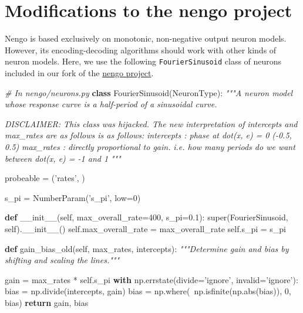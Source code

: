 \documentclass{report}
\newenvironment{Shaded}{}{}
\newcommand{\KeywordTok}[1]{\textcolor[rgb]{0.00,0.44,0.13}{\textbf{{#1}}}}
\newcommand{\DecValTok}[1]{\textcolor[rgb]{0.25,0.63,0.44}{{#1}}}
\newcommand{\FloatTok}[1]{\textcolor[rgb]{0.25,0.63,0.44}{{#1}}}
\newcommand{\StringTok}[1]{\textcolor[rgb]{0.25,0.44,0.63}{{#1}}}
\newcommand{\CommentTok}[1]{\textcolor[rgb]{0.38,0.63,0.69}{\textit{{#1}}}}
\newcommand{\FunctionTok}[1]{\textcolor[rgb]{0.02,0.16,0.49}{{#1}}}
\newcommand{\NormalTok}[1]{{#1}}
\newcommand{\VariableTok}[1]{\textcolor[rgb]{0.10,0.09,0.49}{{#1}}}
\newcommand{\ControlFlowTok}[1]{\textcolor[rgb]{0.00,0.44,0.13}{\textbf{{#1}}}}
\newcommand{\OperatorTok}[1]{\textcolor[rgb]{0.40,0.40,0.40}{{#1}}}
\newcommand{\BuiltInTok}[1]{{#1}}
\begin{document}
    
\section{Modifications to the nengo
project}\label{modifications-to-the-nengo-project}

Nengo is based exclusively on monotonic, non-negative output neuron
models. However, its encoding-decoding algorithms should work with other
kinds of neuron models. Here, we use the following
\texttt{FourierSinusoid} class of neurons included in our fork of the
\href{https://github.com/nengo/nengo/}{nengo project}.

\begin{Shaded}
\begin{Highlighting}[]
\CommentTok{# In nengo/neurons.py}
\KeywordTok{class}\NormalTok{ FourierSinusoid(NeuronType):}
    \CommentTok{"""A neuron model whose response curve is a half-period of a}
\CommentTok{    sinusoidal curve.}

\CommentTok{    DISCLAIMER: This class was hijacked. The new interpretation of}
\CommentTok{    intercepts and max_rates are as follows is as follows:}
\CommentTok{    intercepts : phase at dot(x, e) = 0}
\CommentTok{        (-0.5, 0.5)}
\CommentTok{    max_rates : directly proportional to gain.}
\CommentTok{        i.e. how many periods do we want between dot(x, e) = -1 and 1}
\CommentTok{    """}

\NormalTok{    probeable }\OperatorTok{=}\NormalTok{ (}\StringTok{'rates'}\NormalTok{, )}

\NormalTok{    s_pi }\OperatorTok{=}\NormalTok{ NumberParam(}\StringTok{'s_pi'}\NormalTok{, low}\OperatorTok{=}\DecValTok{0}\NormalTok{)}

    \KeywordTok{def} \FunctionTok{__init__}\NormalTok{(}\VariableTok{self}\NormalTok{, max_overall_rate}\OperatorTok{=}\DecValTok{400}\NormalTok{, s_pi}\OperatorTok{=}\FloatTok{0.1}\NormalTok{):}
        \BuiltInTok{super}\NormalTok{(FourierSinusoid, }\VariableTok{self}\NormalTok{).}\FunctionTok{__init__}\NormalTok{()}
        \VariableTok{self}\NormalTok{.max_overall_rate }\OperatorTok{=}\NormalTok{ max_overall_rate}
        \VariableTok{self}\NormalTok{.s_pi }\OperatorTok{=}\NormalTok{ s_pi}

    \KeywordTok{def}\NormalTok{ gain_bias_old(}\VariableTok{self}\NormalTok{, max_rates, intercepts):}
        \CommentTok{"""Determine gain and bias by shifting and scaling the lines."""}

\NormalTok{        gain }\OperatorTok{=}\NormalTok{ max_rates }\OperatorTok{*} \VariableTok{self}\NormalTok{.s_pi}
        \ControlFlowTok{with}\NormalTok{ np.errstate(divide}\OperatorTok{=}\StringTok{'ignore'}\NormalTok{, invalid}\OperatorTok{=}\StringTok{'ignore'}\NormalTok{):}
\NormalTok{            bias }\OperatorTok{=}\NormalTok{ np.divide(intercepts, gain)}
\NormalTok{        bias }\OperatorTok{=}\NormalTok{ np.where(}\OperatorTok{~}\NormalTok{np.isfinite(np.}\BuiltInTok{abs}\NormalTok{(bias)), }\DecValTok{0}\NormalTok{, bias)}
        \ControlFlowTok{return}\NormalTok{ gain, bias}


\end{Highlighting}
\end{Shaded}
\end{document}
